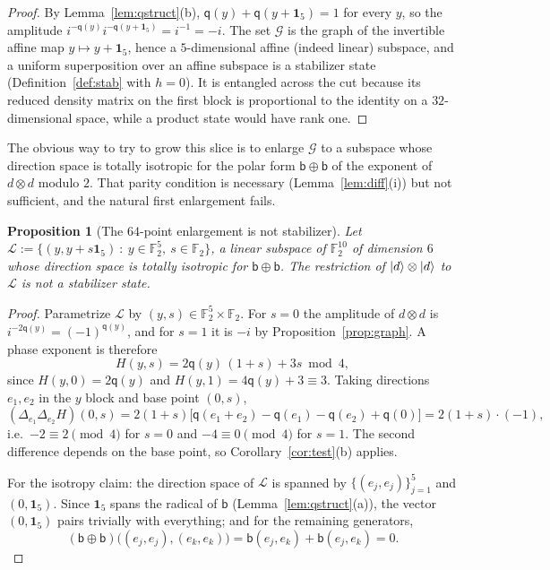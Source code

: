 \documentclass[11pt]{article}
\theoremstyle{plain}
\newtheorem{proposition}[theorem]{Proposition}
\theoremstyle{definition}
\newcommand{\F}{\mathbb{F}}
\newcommand{\qq}{\mathsf{q}}
\newcommand{\bb}{\mathsf{b}}
\newcommand{\one}{\mathbf{1}}
\begin{document}
\begin{proof}
By Lemma~\ref{lem:qstruct}(b), $\qq(y)+\qq(y+\one_5)=1$ for every $y$, so the amplitude
$i^{-\qq(y)}i^{-\qq(y+\one_5)}=i^{-1}=-i$. The set $\mathcal G$ is the graph of the
invertible affine map $y\mapsto y+\one_5$, hence a $5$-dimensional affine (indeed linear)
subspace, and a uniform superposition over an affine subspace is a stabilizer state
(Definition~\ref{def:stab} with $h=0$). It is entangled across the cut because its
reduced density matrix on the first block is proportional to the identity on a
$32$-dimensional space, while a product state would have rank one.
\end{proof}

The obvious way to try to grow this slice is to enlarge $\mathcal G$ to a subspace whose
direction space is totally isotropic for the polar form $\bb\oplus\bb$ of the exponent
of $d\otimes d$ modulo $2$. That parity condition is necessary
(Lemma~\ref{lem:diff}(i)) but not sufficient, and the natural first enlargement fails.

\begin{proposition}[The $64$-point enlargement is not stabilizer]\label{prop:noenlarge}
Let
$\mathcal L:=\{(y,y+s\one_5)\ :\ y\in\F_2^5,\ s\in\F_2\}$, a linear subspace of $\F_2^{10}$
of dimension $6$ whose direction space is totally isotropic for $\bb\oplus\bb$. The
restriction of $\ket d\otimes\ket d$ to $\mathcal L$ is not a stabilizer state.
\end{proposition}

\begin{proof}
Parametrize $\mathcal L$ by $(y,s)\in\F_2^5\times\F_2$. For $s=0$ the amplitude of
$d\otimes d$ is $i^{-2\qq(y)}=(-1)^{\qq(y)}$, and for $s=1$ it is $-i$ by
Proposition~\ref{prop:graph}. A phase exponent is therefore
\[
H(y,s)=2\qq(y)\,(1+s)+3s \bmod 4 ,
\]
since $H(y,0)=2\qq(y)$ and $H(y,1)=4\qq(y)+3\equiv3$. Taking directions $e_1,e_2$ in
the $y$ block and base point $(0,s)$,
\[
(\Delta_{e_1}\Delta_{e_2}H)(0,s)=2(1+s)\big[\qq(e_1+e_2)-\qq(e_1)-\qq(e_2)+\qq(0)\big]
=2(1+s)\cdot(-1),
\]
i.e.\ $-2\equiv2\pmod4$ for $s=0$ and $-4\equiv0\pmod4$ for $s=1$. The second difference
depends on the base point, so Corollary~\ref{cor:test}(b) applies.

For the isotropy claim: the direction space of $\mathcal L$ is spanned by
$\{(e_j,e_j)\}_{j=1}^5$ and $(0,\one_5)$. Since $\one_5$ spans the radical of $\bb$
(Lemma~\ref{lem:qstruct}(a)), the vector $(0,\one_5)$ pairs trivially with everything;
and for the remaining generators,
\[
(\bb\oplus\bb)\big((e_j,e_j),(e_k,e_k)\big)=\bb(e_j,e_k)+\bb(e_j,e_k)=0 .
\]
\end{proof}
\end{document}
